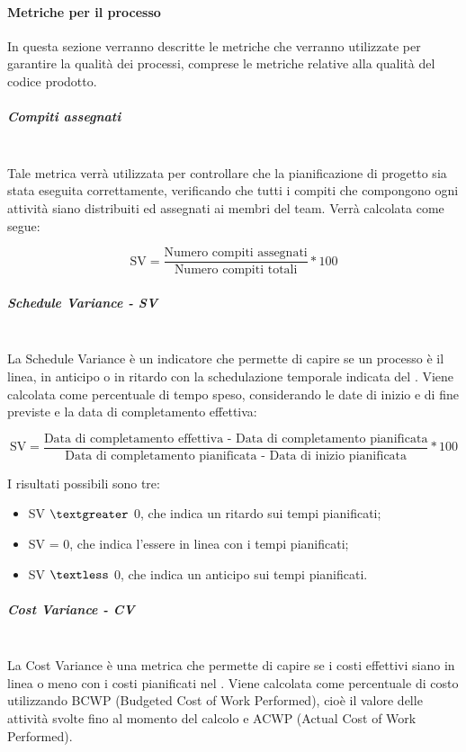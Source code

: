 \paragraph{Metriche per il processo}
\label{AppB:metricheProc}
In questa sezione verranno descritte le metriche che verranno utilizzate per garantire la qualità dei processi, comprese le metriche relative alla qualità del codice prodotto.

\subparagraph{Compiti assegnati}
\label{AppB:SV}
~\\Tale metrica verrà utilizzata per controllare che la pianificazione di progetto sia stata eseguita correttamente, verificando che tutti i compiti che compongono ogni attività siano distribuiti ed assegnati ai membri del team. Verrà calcolata come segue:

\begin{displaymath}
	\mbox{SV}= \frac{\mbox{Numero compiti assegnati}} {\mbox{Numero compiti totali}} * 100
\end{displaymath}


\subparagraph{Schedule Variance - SV}
\label{AppB:SV}
~\\La Schedule Variance è un indicatore che permette di capire se un processo è il linea, in anticipo o in ritardo con la schedulazione temporale indicata del \PdP{}. Viene calcolata come percentuale di tempo speso, considerando le date di inizio e di fine previste e la data di completamento effettiva:

\begin{displaymath}
	\mbox{SV}= \frac{\mbox{Data di completamento effettiva - Data di completamento pianificata}} {\mbox{Data di completamento pianificata - Data di inizio pianificata}} * 100
\end{displaymath}

I risultati possibili sono tre:

\begin{itemize}
	\item SV $\textgreater$ 0, che indica un ritardo sui tempi pianificati;
	\item SV = 0, che indica l'essere in linea con i tempi pianificati;
	\item SV $\textless$ 0, che indica un anticipo sui tempi pianificati.
\end{itemize}

\subparagraph{Cost Variance - CV}
\label{AppB:CV}
~\\La Cost Variance è una metrica che permette di capire se i costi effettivi siano in linea o meno con i costi pianificati nel \PdP{}. Viene calcolata come percentuale di costo utilizzando BCWP (Budgeted Cost of Work Performed), cioè il valore delle attività svolte fino al momento del calcolo e ACWP (Actual Cost of Work Performed).

